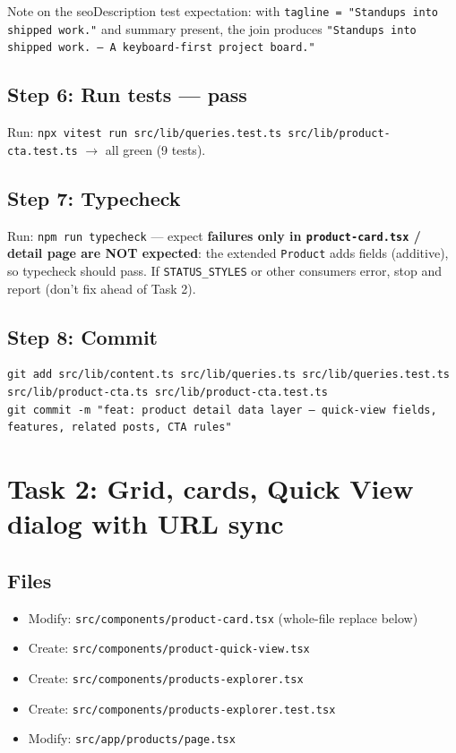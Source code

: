 \documentclass[11pt,a4paper]{article}
\begin{document}
Note on the seoDescription test expectation: with \texttt{tagline = "Standups into shipped
work."} and summary present, the join produces \texttt{"Standups into shipped work. --- A
keyboard-first project board."}

\subsection*{Step 6: Run tests --- pass}

Run: \texttt{npx vitest run src/lib/queries.test.ts src/lib/product-cta.test.ts} $\rightarrow$ all
green (9 tests).

\subsection*{Step 7: Typecheck}

Run: \texttt{npm run typecheck} --- expect \textbf{failures only in \texttt{product-card.tsx} /
detail page are NOT expected}: the extended \texttt{Product} adds fields (additive), so typecheck
should pass. If \texttt{STATUS\_STYLES} or other consumers error, stop and report (don't fix ahead
of Task 2).

\subsection*{Step 8: Commit}

\begin{lstlisting}
git add src/lib/content.ts src/lib/queries.ts src/lib/queries.test.ts src/lib/product-cta.ts src/lib/product-cta.test.ts
git commit -m "feat: product detail data layer — quick-view fields, features, related posts, CTA rules"
\end{lstlisting}

\section{Task 2: Grid, cards, Quick View dialog with URL sync}

\subsection*{Files}
\begin{itemize}
  \item Modify: \texttt{src/components/product-card.tsx} (whole-file replace below)
  \item Create: \texttt{src/components/product-quick-view.tsx}
  \item Create: \texttt{src/components/products-explorer.tsx}
  \item Create: \texttt{src/components/products-explorer.test.tsx}
  \item Modify: \texttt{src/app/products/page.tsx}
\end{itemize}
\end{document}
